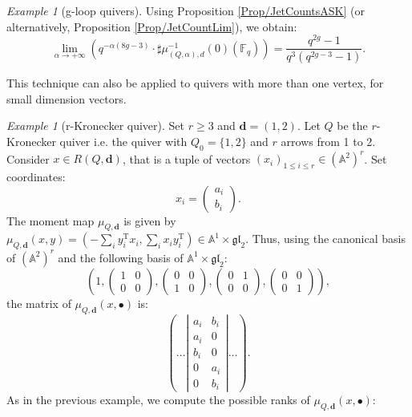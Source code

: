 \documentclass[11pt,english]{article}
\numberwithin{equation}{section}
\numberwithin{figure}{section}
\theoremstyle{definition}
\theoremstyle{plain}
\theoremstyle{remark}
\newtheorem{exmp}[df]{Example}
\newcommand\dd{\mathbf{d}}
\newcommand\FF{\mathbb{F}}
\begin{document}
\begin{exmp}[g-loop quivers]
Using Proposition \ref{Prop/JetCountsASK} (or alternatively, Proposition
\ref{Prop/JetCountLim}), we obtain:\[
\underset{\alpha\rightarrow +\infty}{\lim}\left( q^{-\alpha (8g-3)}\cdot\sharp\mu_{(Q,\alpha),d}^{-1}(0)(\FF_q)\right)=\frac{q^{2g}-1}{q^3(q^{2g-3}-1)}.
\]

\end{exmp}

This technique can also be applied to quivers with more than one vertex,
for small dimension vectors.

\begin{exmp}[r-Kronecker quiver]

Set $r\geq3$ and $\dd=(1,2)$. Let $Q$ be the $r$-Kronecker quiver
i.e. the quiver with $Q_{0}=\{1,2\}$ and $r$ arrows from 1 to 2.
Consider $x\in R(Q,\dd)$, that is a tuple of vectors $(x_{i})_{1\leq i\leq r}\in(\mathbb{A}^{2})^{r}$.
Set coordinates:\[
x_i=
\left(
\begin{array}{c}
a_i \\
b_i
\end{array}
\right)
.
\]The moment map $\mu_{Q,\dd}$ is given by $\mu_{Q,\dd}(x,y)=(-\sum_{i}y_{i}^{\mathrm{T}}x_{i},\sum_{i}x_{i}y_{i}^{\mathrm{T}})\in\mathbb{A}^{1}\times\mathfrak{gl}_{2}$.
Thus, using the canonical basis of $(\mathbb{A}^{2})^{r}$ and the
following basis of $\mathbb{A}^{1}\times\mathfrak{gl}_{2}$:\[
\left(
1,
\left(
\begin{array}{cc}
1 & 0 \\
0 & 0
\end{array}
\right)
,
\left(
\begin{array}{cc}
0 & 0 \\
1 & 0
\end{array}
\right)
,
\left(
\begin{array}{cc}
0 & 1 \\
0 & 0
\end{array}
\right),
\left(
\begin{array}{cc}
0 & 0 \\
0 & 1
\end{array}
\right)
\right),
\]the matrix of $\mu_{Q,\dd}(x,\bullet)$ is:\[
\left(
\ldots
\left\vert
\begin{array}{cc}
a_i & b_i \\
a_i & 0 \\
b_i & 0 \\
0 & a_i \\
0 & b_i
\end{array}
\right\vert
\ldots
\right)
.
\]As in the previous example, we compute the possible ranks of $\mu_{Q,\dd}(x,\bullet)$:

\end{exmp}
\end{document}
